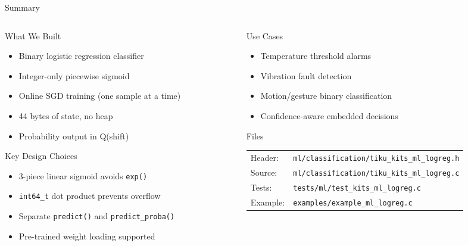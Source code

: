 \documentclass[aspectratio=169, 10pt]{beamer}
\begin{document}
\begin{frame}{Summary}
\begin{columns}[T]
\begin{column}{0.48\textwidth}
\begin{block}{What We Built}
\begin{itemize}
  \item Binary logistic regression classifier
  \item Integer-only piecewise sigmoid
  \item Online SGD training (one sample at a time)
  \item 44 bytes of state, no heap
  \item Probability output in Q(shift)
\end{itemize}
\end{block}

\begin{block}{Key Design Choices}
\begin{itemize}
  \item 3-piece linear sigmoid avoids \texttt{exp()}
  \item \texttt{int64\_t} dot product prevents overflow
  \item Separate \texttt{predict()} and \texttt{predict\_proba()}
  \item Pre-trained weight loading supported
\end{itemize}
\end{block}
\end{column}

\begin{column}{0.48\textwidth}
\begin{block}{Use Cases}
\begin{itemize}
  \item Temperature threshold alarms
  \item Vibration fault detection
  \item Motion/gesture binary classification
  \item Confidence-aware embedded decisions
\end{itemize}
\end{block}

\begin{block}{Files}
\scriptsize
\begin{tabular}{@{}lp{4.5cm}@{}}
Header: & \texttt{ml/classification/tiku\_kits\_ml\_logreg.h} \\
Source: & \texttt{ml/classification/tiku\_kits\_ml\_logreg.c} \\
Tests: & \texttt{tests/ml/test\_kits\_ml\_logreg.c} \\
Example: & \texttt{examples/example\_ml\_logreg.c} \\
\end{tabular}
\end{block}
\end{column}
\end{columns}
\end{frame}
\end{document}
